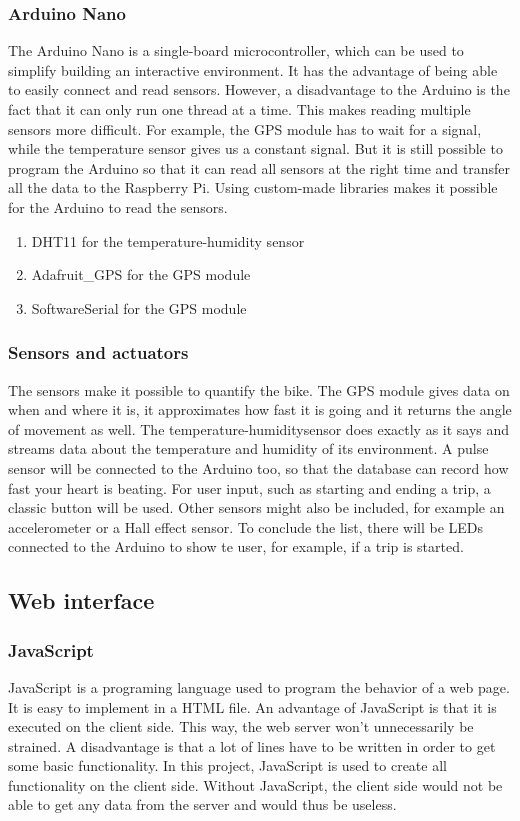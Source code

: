 \subsubsection{Arduino Nano}
The Arduino Nano is a single-board microcontroller, which can be used to simplify building an interactive environment. It has the advantage of being able to easily connect and read sensors. However, a disadvantage to the Arduino is the fact that it can only run one thread at a time. This makes reading multiple sensors more difficult. For example, the GPS module has to wait for a signal, while the temperature sensor gives us a constant signal. But it is still possible to program the Arduino so that it can read all sensors at the right time and transfer all the data to the Raspberry Pi.
Using custom-made libraries makes it possible for the Arduino to read the sensors.
\begin{enumerate}
 \item DHT11 for the temperature-humidity sensor
 \item Adafruit\_GPS for the GPS module
 \item SoftwareSerial for the GPS module
\end{enumerate}

\subsubsection{Sensors and actuators}
The sensors make it possible to quantify the bike. The GPS module gives data on when and where it is, it approximates how fast it is going and it returns the angle of movement as well. The temperature-humiditysensor does exactly as it says and streams data about the temperature and humidity of its environment. A pulse sensor will be connected to the Arduino too, so that the database can record how fast your heart is beating. For user input, such as starting and ending a trip, a classic button will be used. Other sensors might also be included, for example an accelerometer or a Hall effect sensor. To conclude the list, there will be LEDs connected to the Arduino to show te user, for example, if a trip is started.

\subsection{Web interface}
\subsubsection{JavaScript}
JavaScript is a programing language used to program the behavior of a web page.
It is easy to implement in a HTML file. An advantage of JavaScript is that it is
executed on the client side. This way, the web server won't unnecessarily be strained.
A disadvantage is that a lot of lines have to be written in order to get some basic
functionality. In this project, JavaScript is used to create all functionality on the
client side. Without JavaScript, the client side would not be able to get any data from
the server and would thus be useless. 

